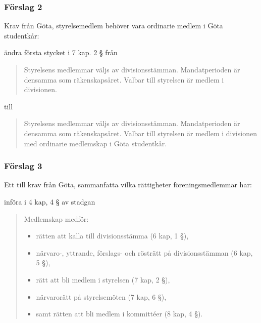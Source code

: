 \documentclass[protokoll]{dvd}
\begin{document}
\subsubsection*{Förslag 2}
Krav från Göta, styrelsemedlem behöver vara ordinarie medlem i Göta studentkår:
\begin{attsatser}
    \item ändra första stycket i 7 kap. 2 § från
    \begin{quote}
        Styrelsens medlemmar väljs av divisionsstämman. Mandatperioden är densamma som räkenskapsåret. Valbar till styrelsen är medlem i divisionen.
    \end{quote}
    till
    \begin{quote}
        Styrelsens medlemmar väljs av divisionsstämman. Mandatperioden är densamma som räkenskapsåret. Valbar till styrelsen är medlem i divisionen med ordinarie medlemskap i Göta studentkår.
    \end{quote}
\end{attsatser}

\subsubsection*{Förslag 3}
Ett till krav från Göta, sammanfatta vilka rättigheter föreningsmedlemmar har:
\begin{attsatser}
    \item införa i 4 kap, 4 § av stadgan 
    \begin{quote}
        Medlemskap medför: 
        \begin{itemize}
            \item rätten att kalla till divisionsstämma (6 kap, 1 §),
            \item närvaro-, yttrande, förslags- och rösträtt på divisionsstämman (6 kap, 5 §),
            \item rätt att bli medlem i styrelsen (7 kap, 2 §),
            \item närvarorätt på styrelsemöten (7 kap, 6 §),
            \item samt rätten att bli medlem i kommittéer (8 kap, 4 §). 
        \end{itemize}
    \end{quote}
\end{attsatser}
\end{document}
